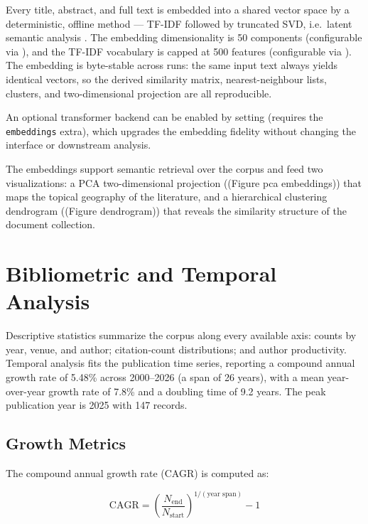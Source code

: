 \documentclass[
  english,
]{article}
\begin{document}
Every title, abstract, and full text is embedded into a shared vector
space by a deterministic, offline method --- TF-IDF followed by
truncated SVD, i.e.~latent semantic analysis
\citep{deerwester1990indexing}. The embedding dimensionality is 50
components (configurable via
), and the TF-IDF
vocabulary is capped at 500 features (configurable via
). The embedding is
byte-stable across runs: the same input text always yields identical
vectors, so the derived similarity matrix, nearest-neighbour lists,
clusters, and two-dimensional projection are all reproducible.

An optional transformer backend can be enabled by setting
 (requires the
\texttt{embeddings} extra), which upgrades the embedding fidelity
without changing the interface or downstream analysis.

The embeddings support semantic retrieval over the corpus and feed two
visualizations: a PCA two-dimensional projection ((Figure pca
embeddings)) that maps the topical geography of the literature, and a
hierarchical clustering dendrogram ((Figure dendrogram)) that reveals
the similarity structure of the document collection.

\newpage

\section{Bibliometric and Temporal
Analysis}\label{bibliometric-and-temporal-analysis}

Descriptive statistics summarize the corpus along every available axis:
counts by year, venue, and author; citation-count distributions; and
author productivity. Temporal analysis fits the publication time series,
reporting a compound annual growth rate of 5.48\% across 2000--2026 (a
span of 26 years), with a mean year-over-year growth rate of 7.8\% and a
doubling time of 9.2 years. The peak publication year is 2025 with 147
records.

\subsection{Growth Metrics}\label{growth-metrics}

The compound annual growth rate (CAGR) is computed as:

\[
\text{CAGR} = \left(\frac{N_{\text{end}}}{N_{\text{start}}}\right)^{1/(\text{year span})} - 1
\]
\end{document}
